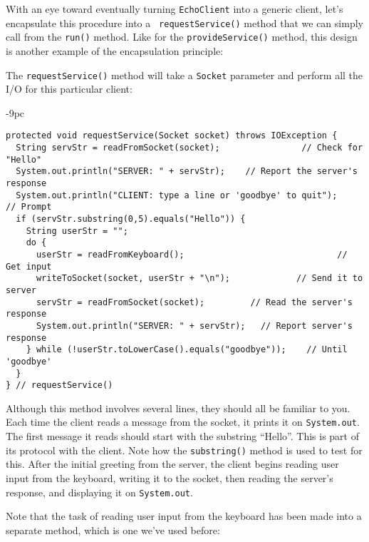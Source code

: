 \noindent With an eye toward eventually turning {\tt EchoClient} into
a generic client, let's encapsulate this procedure into a {\tt
requestService()} method that we can simply call from the {\tt run()}
method.  Like for the {\tt provideService()} method, this design is
another example of the encapsulation principle:


\noindent The {\tt requestService()} method will take a {\tt Socket}
parameter and perform all the I/O for this particular client:

\begin{jjjlistingleft}[35pc]{-9pc}
\begin{lstlisting}
protected void requestService(Socket socket) throws IOException {
  String servStr = readFromSocket(socket);                // Check for "Hello"
  System.out.println("SERVER: " + servStr);    // Report the server's response
  System.out.println("CLIENT: type a line or 'goodbye' to quit");    // Prompt
  if (servStr.substring(0,5).equals("Hello")) {
    String userStr = "";
    do {
      userStr = readFromKeyboard();                              // Get input
      writeToSocket(socket, userStr + "\n");             // Send it to server
      servStr = readFromSocket(socket);         // Read the server's response
      System.out.println("SERVER: " + servStr);   // Report server's response
    } while (!userStr.toLowerCase().equals("goodbye"));    // Until 'goodbye'
  }
} // requestService()
\end{lstlisting}
\end{jjjlistingleft}

\noindent Although this method involves several lines, they should
all be familiar to you.  Each time the client reads a message from the
socket, it prints it on {\tt System.out}. The first message it reads
should start with the substring ``Hello''. This is part of its
protocol with the client.  Note how the {\tt substring()} method is
used to test for this.  After the initial greeting from the server, the
client begins reading user input from the keyboard, writing it to the
socket, then reading the server's response, and displaying it on
{\tt System.out}.

Note that the task of reading user input from the keyboard has been
made into a separate method, which is one we've used before:

